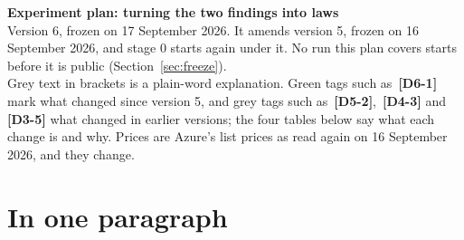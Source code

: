 \documentclass[11pt]{article}
\newcommand{\chg}[1]{\,{\color{chgcol}\bfseries\footnotesize[#1]}}
\newcommand{\chgold}[1]{\,{\color{oldcol}\bfseries\footnotesize[#1]}}
\begin{document}
{\LARGE\bfseries Experiment plan: turning the two findings into laws}\\[3pt]
{\large Version 6, frozen on 17 September 2026. It amends version 5, frozen on 16 September 2026, and stage 0 starts again under it. No run this plan covers starts before it is public (Section~\ref{sec:freeze}).}\\[2pt]
{\color{soft}\small Grey text in brackets is a plain-word explanation. Green tags such as \chg{D6-1} mark what changed since version 5, and grey tags such as \chgold{D5-2}, \chgold{D4-3} and \chgold{D3-5} what changed in earlier versions; the four tables below say what each change is and why. Prices are Azure's list prices as read again on 16 September 2026, and they change.}

\section*{In one paragraph}
\end{document}
